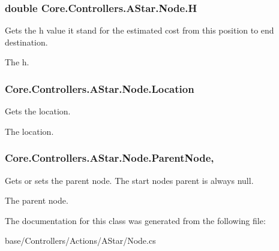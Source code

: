 \subsubsection[{H}]{\setlength{\rightskip}{0pt plus 5cm}double Core.\+Controllers.\+A\+Star.\+Node.\+H\hspace{0.3cm}{\ttfamily [get]}}\label{classCore_1_1Controllers_1_1AStar_1_1Node_affebd55aa7d7b5471b1157055f5c2a7a}


Gets the h value it stand for the estimated cost from this position to end destination. 

The h.\hypertarget{classCore_1_1Controllers_1_1AStar_1_1Node_a035f31738d38e887cef34e7d1a34ea39}{}
\subsubsection[{Location}]{ Core.\+Controllers.\+A\+Star.\+Node.\+Location\hspace{0.3cm}{\ttfamily [get]}}\label{classCore_1_1Controllers_1_1AStar_1_1Node_a035f31738d38e887cef34e7d1a34ea39}


Gets the location. 

The location.\hypertarget{classCore_1_1Controllers_1_1AStar_1_1Node_a1965c3b218d991e0d791521cade9bec1}{}
\subsubsection[{Parent\+Node}]{ Core.\+Controllers.\+A\+Star.\+Node.\+Parent\+Node\hspace{0.3cm}{\ttfamily [get]}, {\ttfamily [set]}}\label{classCore_1_1Controllers_1_1AStar_1_1Node_a1965c3b218d991e0d791521cade9bec1}


Gets or sets the parent node. The start node\textquotesingle{}s parent is always null. 

The parent node.

The documentation for this class was generated from the following file\+:\begin{DoxyCompactItemize}
\item 
base/\+Controllers/\+Actions/\+A\+Star/Node.\+cs\end{DoxyCompactItemize}
